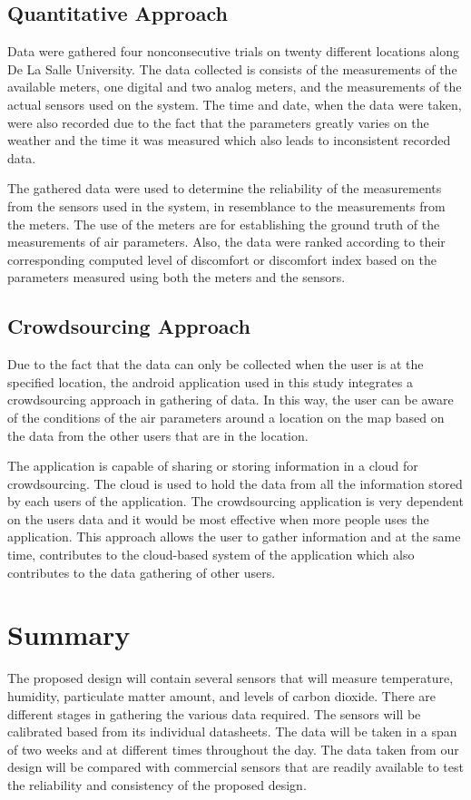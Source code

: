 \subsection{Quantitative Approach}
Data were gathered four nonconsecutive trials on twenty different locations along De La Salle University. The data collected is consists of the measurements of the available meters, one digital and two analog meters, and the measurements of the actual sensors used on the system. The time and date, when the data were taken, were also recorded due to the fact that the parameters greatly varies on the weather and the time it was measured which also leads to inconsistent recorded data. 

The gathered data were used to determine the reliability of the measurements from the sensors used in the system, in resemblance to the measurements from the meters. The use of the meters are for establishing the ground truth of the measurements of air parameters. Also, the data were ranked according to their corresponding computed level of discomfort or discomfort index based on the parameters measured using both the meters and the sensors.

\subsection{Crowdsourcing Approach}
Due to the fact that the data can only be collected when the user is at the specified location, the android application used in this study integrates a crowdsourcing approach in gathering of data. In this way, the user can be aware of the conditions of the air parameters around a location on the map based on the data from the other users that are in the location. 

The application is capable of sharing or storing information in a cloud for crowdsourcing. The cloud is used to hold the data from all the information stored by each users of the application. The crowdsourcing application is very dependent on the users data and it would be most effective when more people uses the application. This approach allows the user to gather information and at the same time, contributes to the cloud-based system of the application which also contributes to the data gathering of other users.

\section{Summary}
The proposed design will contain several sensors that will measure temperature, humidity, particulate matter amount, and levels of carbon dioxide. There are different stages in gathering the various data required. The sensors will be calibrated based from its individual datasheets. The data will be taken in a span of two weeks and at different times throughout the day. The data taken from our design will be compared with commercial sensors that are readily available to test the reliability and consistency of the proposed design. 

